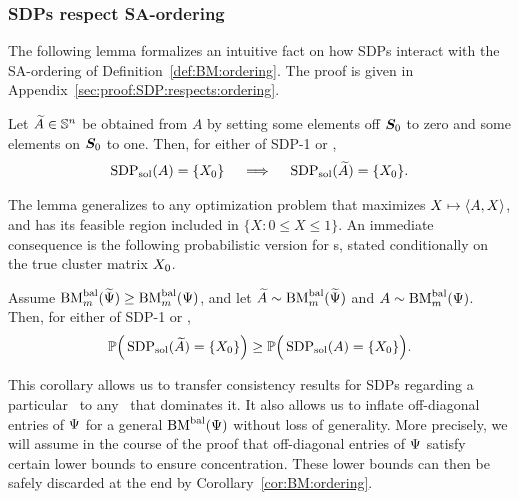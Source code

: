 \subsubsection{SDPs respect SA-ordering}\label{SEC:SDP:RESPECTS:ORDERING}
The following lemma formalizes an intuitive fact on how SDPs interact with the SA-ordering of Definition~\ref{def:BM:ordering}.  The proof is given in Appendix~\ref{sec:proof:SDP:respects:ordering}. %
\begin{lem}\label{lem:deterministic:nesting}
  Let $\widetilde{A} \in \mathbb{S}^{n}$ be obtained from $A$ by setting some elements off $\bm{S}_0$ to zero and some elements on $\bm{S}_0$ to one. Then, for either of SDP-1 or ,
  \begin{align*}
    \operatorname{SDP_{sol}}(A) = \{X_0\} \quad \implies \quad \operatorname{SDP_{sol}}(\widetilde{A}) = \{X_0\}.
  \end{align*}
\end{lem}


The lemma generalizes to any optimization problem that maximizes $X \mapsto \langle A,X\rangle$, and has its feasible region included in $\{X: 0 \le X \le 1\}$.
An immediate consequence is the following probabilistic version for \SBM s, stated conditionally on the true cluster matrix $X_0$. %
\begin{cor}\label{cor:BM:ordering}
  Assume $\textrm{BM}^{\textrm{bal}}_m(\widetilde{\Psi}) \ge \textrm{BM}^{\textrm{bal}}_m(\Psi)$, and let $\widetilde{A} \sim \textrm{BM}^{\textrm{bal}}_m(\widetilde{\Psi})$ and $A \sim \textrm{BM}^{\textrm{bal}}_m(\Psi)$. Then, for either of SDP-1 or ,
  \begin{align*}
    \mathbb{P}\Big( \operatorname{SDP_{sol}}(\widetilde{A}) = \{X_0 \} \Big ) \ge \mathbb{P}\Big( \operatorname{SDP_{sol}}(A) = \{X_0 \} \Big ).
  \end{align*}
\end{cor}


This corollary allows us to transfer consistency results for SDPs regarding a particular \SBM\  to any \SBM\  that dominates it. It also allows us to inflate off-diagonal entries of $\Psi$ for a general $\textrm{BM}^{\textrm{bal}}(\Psi)$ without loss of generality. More precisely, we will assume in the course of the proof that off-diagonal entries of $\Psi$ satisfy certain lower bounds to ensure concentration. These lower bounds can then be safely discarded at the end by Corollary~\ref{cor:BM:ordering}.



